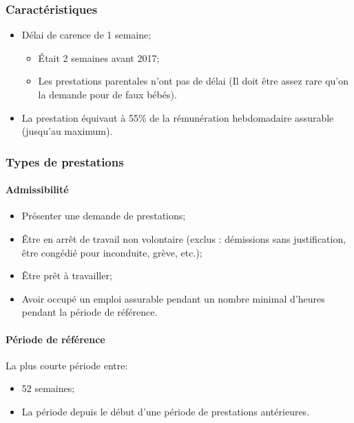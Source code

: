 \documentclass[10pt, french]{article}
\begin{document}
\begin{multicols*}{3}
\subsubsection*{Caractéristiques}
\begin{itemize}[leftmargin = *]
	\item	Délai de carence de 1 semaine;
		\begin{itemize}[leftmargin = *]
		\item	Était 2 semaines avant 2017;
		\item	Les prestations parentales n'ont pas de délai (Il doit être assez rare qu'on la demande pour de faux bébés).
		\end{itemize}
	\item	La prestation équivaut à 55\% de la rémunération hebdomadaire assurable (jusqu'au maximum).
\end{itemize}

\subsubsection*{Types de prestations}
\begin{definitionNOHFILL}
\paragraph{Admissibilité}
\begin{itemize}[leftmargin = *]
	\item	Présenter une demande de prestations;
	\item	Être en arrêt de travail non volontaire (exclus : démissions sans justification, être congédié pour inconduite, grève, etc.);
	\item	Être prêt à travailler;
	\item	Avoir occupé un emploi assurable pendant un nombre minimal d'heures pendant la période de référence.
\end{itemize}

\paragraph{Période de référence}
La plus courte période entre:
\begin{itemize}[leftmargin = *]
	\item	52 semaines;
	\item	La période depuis le début d'une période de prestations antérieures.
\end{itemize}


\end{definitionNOHFILL}
\end{multicols*}
\end{document}
